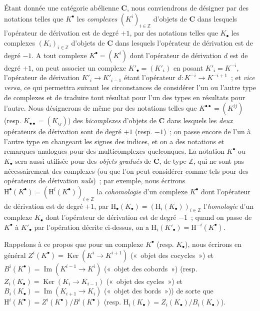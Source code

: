 \begin{env}[11.2.1]
\label{0.11.2.1-fr}
Étant donnée une catégorie abélienne $\boldsymbol{C}$, nous conviendrons de
désigner par des notations telles que $K^\bullet$ les \emph{complexes}
$(K^i)_{i\in\mathbb Z}$ d'objets de $\boldsymbol{C}$ dans lesquels l'opérateur de
dérivation est de degré $+1$, par des notations telles que $K_\bullet$ les
complexes $(K_i)_{i\in\mathbb Z}$ d'objets de $\boldsymbol{C}$ dans lesquels
l'opérateur de dérivation est de degré $-1$. A tout complexe
$K^\bullet=(K^i)$ dont l'opérateur de dérivation $d$ est de degré $+1$, on
peut associer un complexe $K'_\bullet=(K'_i)$ en posant $K'_i=K^{-i}$,
l'opérateur de dérivation $K'_i\to K'_{i-1}$ étant l'opérateur
$d:K^{-i}\to K^{-i+1}$~; et \emph{vice versa}, ce qui permettra suivant les
circonstances de considérer l'un ou l'autre type de complexes et de traduire
tout résultat pour l'un des types en résultats pour l'autre. Nous désignerons
de même par des notations telles que $K^{\bullet\bullet}=(K^{ij})$ (resp.
$K_{\bullet\bullet}=(K_{ij})$) des \emph{bicomplexes} d'objets de
$\boldsymbol{C}$ dans lesquels les \emph{deux} opérateurs de dérivation sont de
degré $+1$ (resp. $-1$)~; on passe encore de l'un à l'autre type en changeant
les signes des indices, et on a des notations et remarques analogues pour des
multicomplexes quelconques. La notation $K^\bullet$ ou $K_\bullet$ sera aussi
utilisée pour des \emph{objets gradués} de $\boldsymbol{C}$, de type $\mathbb Z$,
qui ne sont pas nécessairement des complexes (ou que l'on peut considérer
comme tels pour des opérateurs de dérivation \emph{nuls})~; par exemple, nous
écrirons
$\mathrm H^\bullet(K^\bullet)=(\mathrm H^i(K^\bullet))_{i\in\mathbb Z}$ la
\emph{cohomologie} d'un complexe $K^\bullet$ dont l'opérateur de dérivation
est de degré $+1$, par
$\mathrm H_\bullet(K_\bullet)=(\mathrm H_i(K_\bullet))_{i\in\mathbb Z}$
l'\emph{homologie} d'un complexe $K_\bullet$ dont l'opérateur de dérivation
est de degré $-1$~; quand on passe de $K^\bullet$ à $K'_\bullet$ par
l'opération décrite ci-dessus, on a
$\mathrm H_i(K'_\bullet)=\mathrm H^{-i}(K^\bullet)$.

Rappelons à ce propos que pour un complexe $K^\bullet$ (resp. $K_\bullet$),
nous écrirons en général
$Z^i(K^\bullet)=\operatorname{Ker}(K^i\to K^{i+1})$ («~objet des cocycles~»)
et $B^i(K^\bullet)=\operatorname{Im}(K^{i-1}\to K^i)$ («~objet des
cobords~») (resp.
$Z_i(K_\bullet)=\operatorname{Ker}(K_i\to K_{i-1})$ («~objet des cycles~»)
et $B_i(K_\bullet)=\operatorname{Im}(K_{i+1}\to K_i)$ («~objet des
bords~»)) de sorte que
$\mathrm H^i(K^\bullet)=Z^i(K^\bullet)/B^i(K^\bullet)$ (resp.
$\mathrm H_i(K_\bullet)=Z_i(K_\bullet)/B_i(K_\bullet)$).


\end{env}
